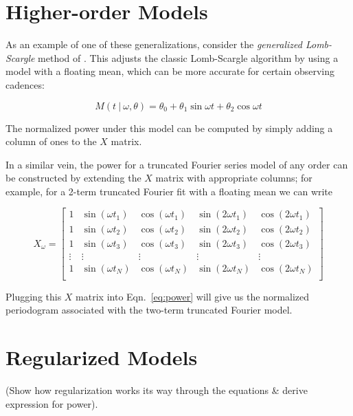 \documentclass[12pt,preprint]{aastex}
\begin{document}
\section{Higher-order Models}

As an example of one of these generalizations, consider the {\it generalized Lomb-Scargle} method of \citep{Zechmeister09}. This adjusts the classic Lomb-Scargle algorithm by using a model with a floating mean, which can be more accurate for certain observing cadences:

\begin{equation}
  M(t~|~\omega, \theta) = \theta_0 + \theta_1\sin\omega t + \theta_2\cos\omega t
\end{equation}

The normalized power under this model can be computed by simply adding a column of ones to the $X$ matrix.

In a similar vein, the power for a truncated Fourier series model of any order can be constructed by extending the $X$ matrix with appropriate columns; for example, for a 2-term truncated Fourier fit with a floating mean we can write

\begin{equation}
X_\omega = \left[
\begin{array}{ccccc}
1 & \sin(\omega t_1) & \cos(\omega t_1) & \sin(2\omega t_1) & \cos(2\omega t_1)\\
1 & \sin(\omega t_2) & \cos(\omega t_2) & \sin(2\omega t_2) & \cos(2\omega t_2)\\
1 & \sin(\omega t_3) & \cos(\omega t_3) & \sin(2\omega t_3) & \cos(2\omega t_3)\\
\vdots & \vdots & \vdots & \vdots & \vdots \\
1 & \sin(\omega t_N) & \cos(\omega t_N) & \sin(2\omega t_N) & \cos(2\omega t_N)\\
\end{array}
\right]
\end{equation}

Plugging this $X$ matrix into Eqn.~\ref{eq:power} will give us the normalized periodogram associated with the two-term truncated Fourier model.

\section{Regularized Models}

(Show how regularization works its way through the equations \& derive expression for power).
\end{document}
